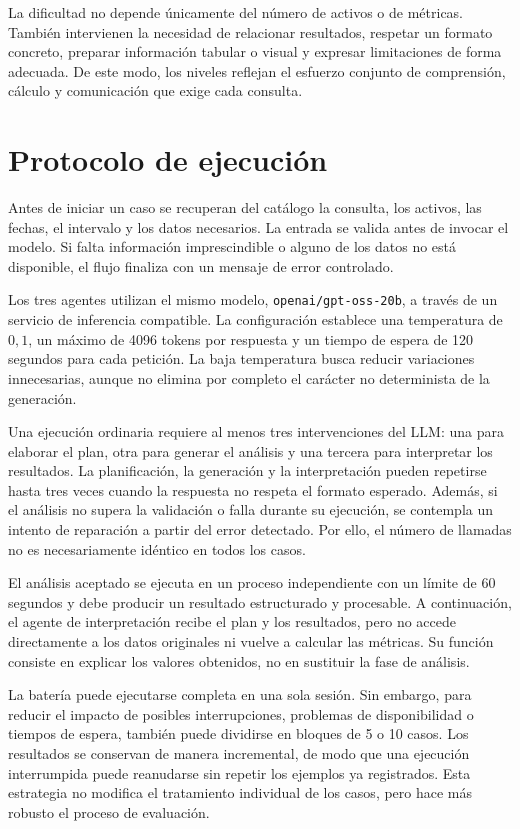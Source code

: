 La dificultad no depende únicamente del número de activos o de métricas. También intervienen la necesidad de relacionar resultados, respetar un formato concreto, preparar información tabular o visual y expresar limitaciones de forma adecuada. De este modo, los niveles reflejan el esfuerzo conjunto de comprensión, cálculo y comunicación que exige cada consulta.

\section{Protocolo de ejecución}

Antes de iniciar un caso se recuperan del catálogo la consulta, los activos, las fechas, el intervalo y los datos necesarios. La entrada se valida antes de invocar el modelo. Si falta información imprescindible o alguno de los datos no está disponible, el flujo finaliza con un mensaje de error controlado.

Los tres agentes utilizan el mismo modelo, \texttt{openai/gpt-oss-20b}, a través de un servicio de inferencia compatible. La configuración establece una temperatura de \(0{,}1\), un máximo de 4096 tokens por respuesta y un tiempo de espera de 120 segundos para cada petición. La baja temperatura busca reducir variaciones innecesarias, aunque no elimina por completo el carácter no determinista de la generación.

Una ejecución ordinaria requiere al menos tres intervenciones del LLM: una para elaborar el plan, otra para generar el análisis y una tercera para interpretar los resultados. La planificación, la generación y la interpretación pueden repetirse hasta tres veces cuando la respuesta no respeta el formato esperado. Además, si el análisis no supera la validación o falla durante su ejecución, se contempla un intento de reparación a partir del error detectado. Por ello, el número de llamadas no es necesariamente idéntico en todos los casos.

El análisis aceptado se ejecuta en un proceso independiente con un límite de 60 segundos y debe producir un resultado estructurado y procesable. A continuación, el agente de interpretación recibe el plan y los resultados, pero no accede directamente a los datos originales ni vuelve a calcular las métricas. Su función consiste en explicar los valores obtenidos, no en sustituir la fase de análisis.

La batería puede ejecutarse completa en una sola sesión. Sin embargo, para reducir el impacto de posibles interrupciones, problemas de disponibilidad o tiempos de espera, también puede dividirse en bloques de 5 o 10 casos. Los resultados se conservan de manera incremental, de modo que una ejecución interrumpida puede reanudarse sin repetir los ejemplos ya registrados. Esta estrategia no modifica el tratamiento individual de los casos, pero hace más robusto el proceso de evaluación.

